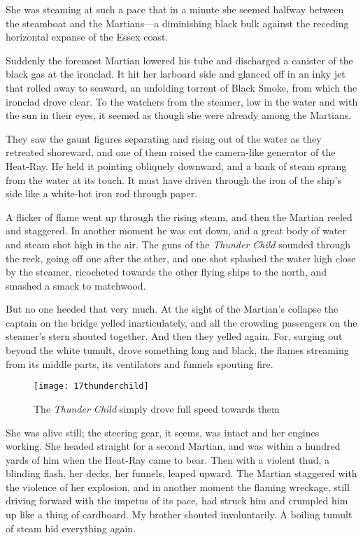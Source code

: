 She was steaming at such a pace that in a minute she seemed halfway between the steamboat and the Martians—a diminishing black bulk against the receding horizontal expanse of the Essex coast.

Suddenly the foremost Martian lowered his tube and discharged a canister of the black gas at the ironclad. It hit her larboard side and glanced off in an inky jet that rolled away to seaward, an unfolding torrent of Black Smoke, from which the ironclad drove clear. To the watchers from the steamer, low in the water and with the sun in their eyes, it seemed as though she were already among the Martians.

They saw the gaunt figures separating and rising out of the water as they retreated shoreward, and one of them raised the camera-like generator of the Heat-Ray. He held it pointing obliquely downward, and a bank of steam sprang from the water at its touch. It must have driven through the iron of the ship's side like a white-hot iron rod through paper.

A flicker of flame went up through the rising steam, and then the Martian reeled and staggered. In another moment he was cut down, and a great body of water and steam shot high in the air. The guns of the \textit{Thunder Child} sounded through the reek, going off one after the other, and one shot splashed the water high close by the steamer, ricocheted towards the other flying ships to the north, and smashed a smack to matchwood.

But no one heeded that very much. At the sight of the Martian's collapse the captain on the bridge yelled inarticulately, and all the crowding passengers on the steamer's stern shouted together. And then they yelled again. For, surging out beyond the white tumult, drove something long and black, the flames streaming from its middle parts, its ventilators and funnels spouting fire.

\begin{figure}[tbh]
\centering
\texttt{[image: 17thunderchild]}
\caption{The \textit{Thunder Child} simply drove full speed towards them}
\end{figure}

She was alive still; the steering gear, it seems, was intact and her engines working. She headed straight for a second Martian, and was within a hundred yards of him when the Heat-Ray came to bear. Then with a violent thud, a blinding flash, her decks, her funnels, leaped upward. The Martian staggered with the violence of her explosion, and in another moment the flaming wreckage, still driving forward with the impetus of its pace, had struck him and crumpled him up like a thing of cardboard. My brother shouted involuntarily. A boiling tumult of steam hid everything again.

